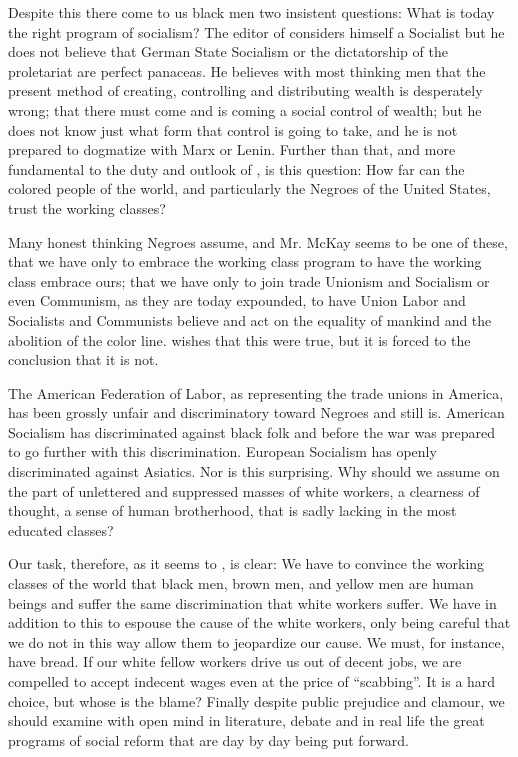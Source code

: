 \documentclass[letterpaper,10pt,english]{jupyterBook}
\begin{document}
\sphinxAtStartPar
Despite this there come to us black men two insistent questions: What is today the right program of socialism? The editor of  considers himself a Socialist but he does not believe that German State Socialism or the dictatorship of the proletariat are perfect panaceas. He believes with most thinking men that the present method of creating, controlling and distributing wealth is desperately wrong; that there must come and is coming a social control of wealth; but he does not know just what form that control is going to take, and he is not prepared to dogmatize with Marx or Lenin. Further than that, and more fundamental to the duty and outlook of , is this question: How far can the colored people of the world, and particularly the Negroes of the United States, trust the working classes?

\sphinxAtStartPar
Many honest thinking Negroes assume, and Mr. McKay seems to be one of these, that we have only to embrace the working class program to have the working class embrace ours; that we have only to join trade Unionism and Socialism or even Communism, as they are today expounded, to have Union Labor and Socialists and Communists believe and act on the equality of mankind and the abolition of the color line.  wishes that this were true, but it is forced to the conclusion that it is not.

\sphinxAtStartPar
The American Federation of Labor, as representing the trade unions in America, has been grossly unfair and discriminatory toward Negroes and still is. American Socialism has discriminated against black folk and before the war was prepared to go further with this discrimination. European Socialism has openly discriminated against Asiatics. Nor is this surprising. Why should we assume on the part of unlettered and suppressed masses of white workers, a clearness of thought, a sense of human brotherhood, that is sadly lacking in the most educated classes?

\sphinxAtStartPar
Our task, therefore, as it seems to , is clear: We have to convince the working classes of the world that black men, brown men, and yellow men are human beings and suffer the same discrimination that white workers suffer. We have in addition to this to espouse the cause of the white workers, only being careful that we do not in this way allow them to jeopardize our cause. We must, for instance, have bread. If our white fellow workers drive us out of decent jobs, we are compelled to accept indecent wages even at the price of “scabbing”. It is a hard choice, but whose is the blame? Finally despite public prejudice and clamour, we should examine with open mind in literature, debate and in real life the great programs of social reform that are day by day being put forward.
\end{document}
